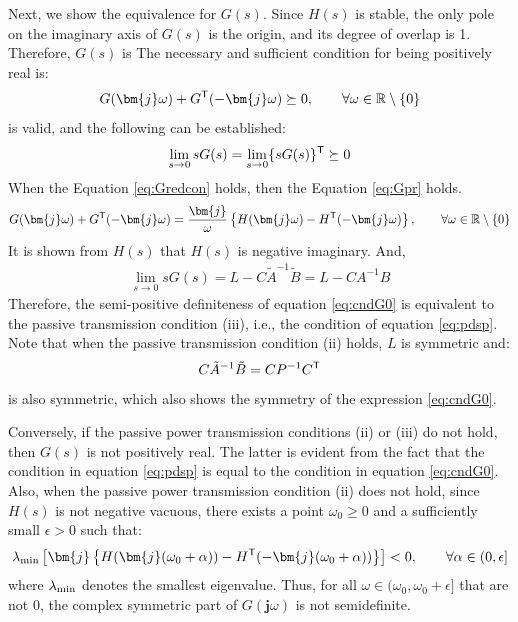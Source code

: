 \documentclass[graybox, envcountchap]{svmult}
\begin{document}
\begin{証明}
Next, we show the equivalence for $G(s)$.
Since $H(s)$ is stable, the only pole on the imaginary axis of $G(s)$ is the origin, and its degree of overlap is 1.
Therefore, $G(s)$ is
The necessary and sufficient condition for being positively real is:
\begin{align}\label{eq:Gpr}
G(\bm{j}\omega) + G^{\sf T}(-\bm{j}\omega) \succeq 0
,\qquad \forall \omega \in \mathbb{R}\setminus\{0\}
\end{align}
is valid, and the following can be established:
\begin{align}\label{eq:cndG0}
\lim_{s\rightarrow 0} s G(s) = \lim_{s\rightarrow 0} \{ s G(s)\}^{\sf T}\succeq 0
\end{align}
When the Equation \ref{eq:Gredcon} holds, then the Equation \ref{eq:Gpr} holds.
\begin{align}\label{eq:NIineq}
G(\bm{j}\omega) + G^{\sf T}(-\bm{j}\omega)
=
\frac{\bm{j}}{\omega} \left\{
H(\bm{j}\omega) - H^{\sf T}(-\bm{j}\omega)
\right\}
,\qquad \forall \omega \in \mathbb{R}\setminus\{0\}
\end{align}
It is shown from $H(s)$ that $H(s)$ is negative imaginary.
And,
\begin{align*}
\lim_{s\rightarrow 0} s G(s) =
L - C\tilde{A}^{-1}\tilde{B} = L - C A^{-1} B
\end{align*}
Therefore, the semi-positive definiteness of equation \ref{eq:cndG0} is equivalent to the passive transmission condition (iii), i.e., the condition of equation \ref{eq:pdsp}.
Note that when the passive transmission condition (ii) holds, $L$ is symmetric and:
\begin{align*}
C\tilde{A}^{-1}\tilde{B} = C P^{-1} C^{\sf T}
\end{align*}
is also symmetric, which also shows the symmetry of the expression \ref{eq:cndG0}.

Conversely, if the passive power transmission conditions (ii) or (iii) do not hold, then $G(s)$ is not positively real.
The latter is evident from the fact that the condition in equation \ref{eq:pdsp} is equal to the condition in equation \ref{eq:cndG0}.
Also, when the passive power transmission condition (ii) does not hold, since $H(s)$ is not negative vacuous, 
there exists a point $\omega_0\geq 0$ and a sufficiently small $\epsilon >0$ such that:
\begin{align*}
\lambda_{\rm min}\left[
\bm{j}
\left\{
H(\bm{j}(\omega_0 + \alpha )) - H^{\sf T}(-\bm{j}(\omega_0 + \alpha ))
\right\}
\right] < 0
,\qquad
\forall \alpha \in (0,\epsilon] 
\end{align*}
where $\lambda_{\rm min}$ denotes the smallest eigenvalue.
Thus, for all $\omega \in (\omega_0, \omega_0+\epsilon] $ that are not 0, the complex symmetric part of $G(\bm{j} \omega) $ is not semidefinite.
\end{証明}
\end{document}
